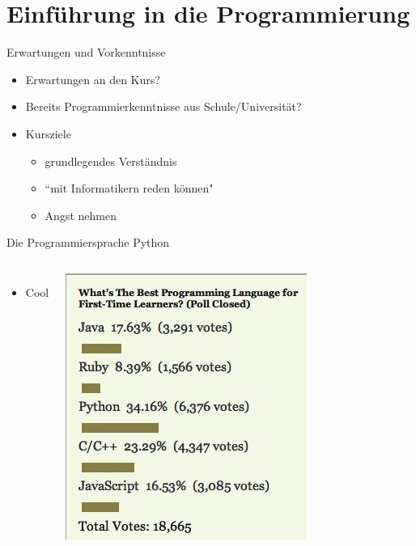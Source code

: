 \section{Einführung in die Programmierung}

\begin{frame}{Erwartungen und Vorkenntnisse}
    \begin{itemize}
        \item Erwartungen an den Kurs?
        \item Bereits Programmierkenntnisse aus Schule/Universität?
        \item Kursziele 
            \begin{itemize}
                \item grundlegendes Verständnis
                \item ``mit Informatikern reden können"
                \item Angst nehmen
            \end{itemize}
    \end{itemize}
\end{frame}

\begin{frame}{Die Programmiersprache Python}
\begin{columns}
    \begin{itemize}
        \item Cool
    \end{itemize}
    \centering\includegraphics[scale=0.5]{images/best_lang} 
\end{columns}
\end{frame}


